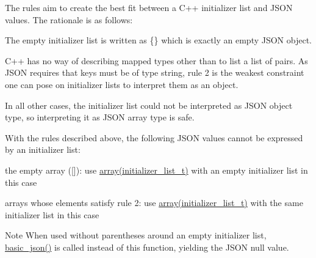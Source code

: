The rules aim to create the best fit between a C++ initializer list and J\+S\+ON values. The rationale is as follows\+:


\begin{DoxyEnumerate}
\item The empty initializer list is written as {\ttfamily \{\}} which is exactly an empty J\+S\+ON object.
\item C++ has no way of describing mapped types other than to list a list of pairs. As J\+S\+ON requires that keys must be of type string, rule 2 is the weakest constraint one can pose on initializer lists to interpret them as an object.
\item In all other cases, the initializer list could not be interpreted as J\+S\+ON object type, so interpreting it as J\+S\+ON array type is safe.
\end{DoxyEnumerate}

With the rules described above, the following J\+S\+ON values cannot be expressed by an initializer list\+:


\begin{DoxyItemize}
\item the empty array ({\ttfamily \mbox{[}\mbox{]}})\+: use \hyperlink{classnlohmann_1_1basic__json_a2c8d8f5741aedadac8f3bffd8f2ce13e}{array(initializer\+\_\+list\+\_\+t)} with an empty initializer list in this case
\item arrays whose elements satisfy rule 2\+: use \hyperlink{classnlohmann_1_1basic__json_a2c8d8f5741aedadac8f3bffd8f2ce13e}{array(initializer\+\_\+list\+\_\+t)} with the same initializer list in this case
\end{DoxyItemize}

\begin{DoxyNote}{Note}
When used without parentheses around an empty initializer list, \hyperlink{classnlohmann_1_1basic__json_a19734fbc9c97d536832892ddacd6b62a}{basic\+\_\+json()} is called instead of this function, yielding the J\+S\+ON null value.
\end{DoxyNote}

